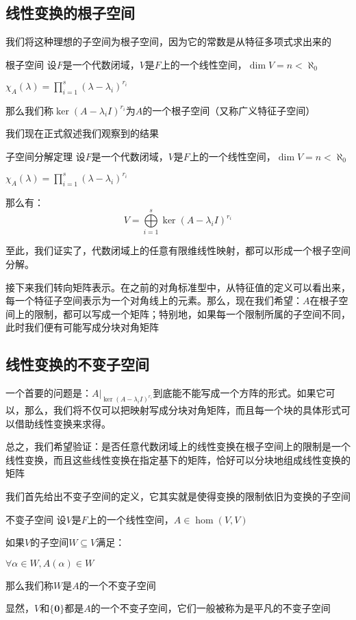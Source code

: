\documentclass[12pt, a4paper, oneside, UTF8]{ctexbook}
\begin{document}
		\subsection{线性变换的根子空间}
			我们将这种理想的子空间为根子空间，因为它的常数是从特征多项式求出来的
			\begin{defn}{根子空间}{}
				设$F$是一个代数闭域，$V$是$F$上的一个线性空间，$\dim V = n < \aleph_0$

				$\chi_A(\lambda )=\prod\limits_{i=1}^{s} (\lambda -\lambda_i)^{r_i}$

				那么我们称$\ker (A-\lambda_iI)^{r_i}$为$A$的一个根子空间（又称广义特征子空间）
			\end{defn}
			我们现在正式叙述我们观察到的结果
			\begin{them}{子空间分解定理}{}
				设$F$是一个代数闭域，$V$是$F$上的一个线性空间，$\dim V = n < \aleph_0$

				$\chi_A(\lambda )=\prod\limits_{i=1}^{s} (\lambda -\lambda_i)^{r_i}$

				那么有：
				\begin{equation}
					V = \bigoplus\limits_{i=1}^{s} \ker (A-\lambda_i I)^{r_i}
				\end{equation}
			\end{them}
			至此，我们证实了，代数闭域上的任意有限维线性映射，都可以形成一个根子空间分解。

			接下来我们转向矩阵表示。在之前的对角标准型中，从特征值的定义可以看出来，每一个特征子空间表示为一个对角线上的元素。那么，现在我们希望：$A$在根子空间上的限制，都可以写成一个矩阵；特别地，如果每一个限制所属的子空间不同，此时我们便有可能写成分块对角矩阵
		\subsection{线性变换的不变子空间}
			一个首要的问题是：$A|_{\ker (A-\lambda_i I)^{r_i}}$到底能不能写成一个方阵的形式。如果它可以，那么，我们将不仅可以把映射写成分块对角矩阵，而且每一个块的具体形式可以借助线性变换来求得。

			总之，我们希望验证：是否任意代数闭域上的线性变换在根子空间上的限制是一个线性变换，而且这些线性变换在指定基下的矩阵，恰好可以分块地组成线性变换的矩阵

			我们首先给出不变子空间的定义，它其实就是使得变换的限制依旧为变换的子空间
			\begin{defn}{不变子空间}{}
				设$V$是$F$上的一个线性空间，$A \in \hom(V,V)$

				如果$V$的子空间$W \subseteq V$满足：

				$\forall \alpha \in W,A(\alpha ) \in W$

				那么我们称$W$是$A$的一个不变子空间
			\end{defn}
			显然，$V$和$\{\mathbf{0}\}$都是$A$的一个不变子空间，它们一般被称为是平凡的不变子空间
\end{document}
